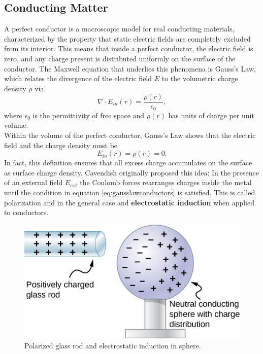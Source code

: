 \label{sec:Conducting Matter and Currents}
\subsection{Conducting Matter}
A perfect conductor is a macroscopic model for real conducting materials, characterized by the property that static electric fields are completely excluded from its interior. This means that inside a perfect conductor, the electric field is zero, and any charge present is distributed uniformly on the surface of the conductor. The Maxwell equation that underlies this phenomena is Gauss's Law, which relates the divergence of the electric field $E$ to the volumetric charge density $\rho$ via
\begin{equation}
\nabla \cdot E_{in}(r) = \frac{\rho(r)}{\epsilon_0},
\end{equation}
where  $\epsilon_0$ is the permittivity of free space and $\rho(r)$ has units of charge per unit volume. 
\\

Within the volume of the perfect conductor, Gauss's Law shows that the electric field and the charge density must be
\begin{equation}
\label{eq:gausslawconductors}
E_{in}(r) = \rho(r) = 0.
\end{equation}
In fact, this definition ensures that all excess charge accumulates on the surface as surface charge density. Cavendish originally proposed this idea: In the presence of an external field $E_{ext}$  the Coulomb forces rearranges charges inside the metal until the condition in equation \ref{eq:gausslawconductors} is satisfied. This is called polarization and in the general case and \textbf{electrostatic induction} when applied to conductors. 
\begin{figure}[H]
    \centering
    \includegraphics[scale=0.75]{Figures/electricpolarization.jpg}
    \caption{Polarized glass rod and electrostatic induction in sphere.}
    \label{fig:my_label}
\end{figure}

